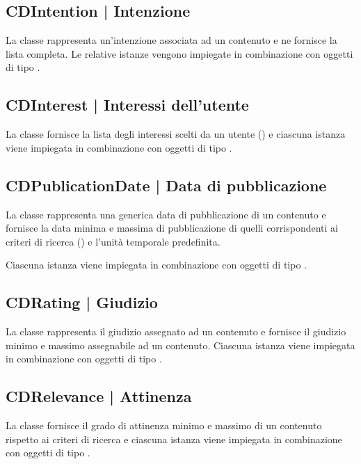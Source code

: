 \documentclass[10pt,a4paper,headinclude,footinclude,hidelinks]{scrreprt} %
\begin{document}
	\subsection[CDIntention]{CDIntention | Intenzione}
	\label{sec:stage:design:sistema:model.criteria:intention}
	La classe rappresenta un'intenzione associata ad un contenuto e ne fornisce la lista completa. Le relative istanze vengono impiegate in combinazione con oggetti di tipo \textit{}.

	\subsection[CDInterest]{CDInterest | Interessi dell'utente}
	\label{sec:stage:design:sistema:model.criteria:interest}
	La classe fornisce la lista degli interessi scelti da un utente (\textit{}) e ciascuna istanza viene impiegata in combinazione con oggetti di tipo \textit{}.

	\subsection[CDPublicationDate]{CDPublicationDate | Data di pubblicazione}
	\label{sec:stage:design:sistema:model.criteria:publication-date}
	La classe rappresenta una generica data di pubblicazione di un contenuto e fornisce la data minima e massima di pubblicazione di quelli corrispondenti ai criteri di ricerca (\textit{}) e l'unità temporale predefinita.

	Ciascuna istanza viene impiegata in combinazione con oggetti di tipo \textit{}.

	\subsection[CDRating]{CDRating | Giudizio}
	\label{sec:stage:design:sistema:model.criteria:rating}
	La classe rappresenta il giudizio assegnato ad un contenuto e fornisce il giudizio minimo e massimo assegnabile ad un contenuto. Ciascuna istanza viene impiegata in combinazione con oggetti di tipo \textit{}.

	\subsection[CDRelevance]{CDRelevance | Attinenza}
	\label{sec:stage:design:sistema:model.criteria:relevance}
	La classe fornisce il grado di attinenza minimo e massimo di un contenuto rispetto ai criteri di ricerca e ciascuna istanza viene impiegata in combinazione con oggetti di tipo \textit{}.
\end{document}
